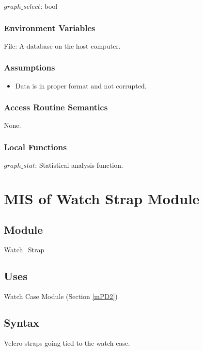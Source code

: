 \documentclass[12pt, titlepage]{article}
\begin{document}
$graph\_select$: bool

\subsubsection{Environment Variables}

File: A database on the host computer.

\subsubsection{Assumptions}

\begin{itemize}
\item Data is in proper format and not corrupted.
\end{itemize}

\subsubsection{Access Routine Semantics}

None.

\subsubsection{Local Functions}

$graph\_stat$: Statistical analysis function.

\newpage


\section{MIS of Watch Strap Module} \label{mPD} 

\subsection{Module}

Watch\_Strap

\subsection{Uses}
Watch Case Module (Section \ref{mPD2})

\subsection{Syntax}

Velcro straps going tied to the watch case.
\end{document}

